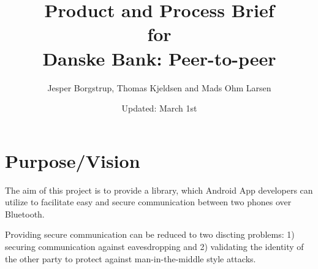 \documentclass[a4paper,11pt]{article}
\title{Product and Process Brief\\\small{for}\\\small{Danske Bank: Peer-to-peer}}
\author{ Jesper Borgstrup, Thomas Kjeldsen and Mads Ohm Larsen }
\date{Updated: March 1st}
\begin{document}
\ifpdf
{}
\else
{}
\fi

\maketitle

\tableofcontents
\vspace{2cm}






\pagebreak 

\section{Purpose/Vision} %
\label{sec:purpose_vision}

The aim of this project is to provide a library, which Android App developers can utilize to facilitate easy and secure communication between two phones over Bluetooth.

Providing secure communication can be reduced to two discting problems: 1) securing communication against eavesdropping and 2) validating the identity of the other party to protect against man-in-the-middle style attacks.
\end{document}
